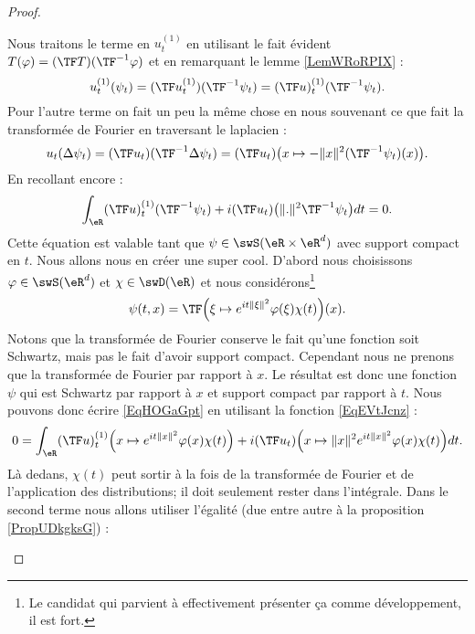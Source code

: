 \begin{proof}
\begin{subproof}
        Nous traitons le terme en \( u_t^{(1)}\) en utilisant le fait évident \( T(\varphi)=(\TF T)(\TF^{-1}\varphi)\) et en remarquant le lemme \ref{LemWRoRPIX} :
        \begin{equation}
            u_t^{(1)}(\psi_t)=(\TF u_t^{(1)})(\TF^{-1}\psi_t)=(\TF u)_t^{(1)}(\TF^{-1}\psi_t).
        \end{equation}
        Pour l'autre terme on fait un peu la même chose en nous souvenant ce que fait la transformée de Fourier en traversant le laplacien :
        \begin{equation}
            u_t(\Delta\psi_t)=(\TF u_t)(\TF^{-1}\Delta\psi_t)=(\TF u_t)\big( x\mapsto -\| x \|^2(\TF^{-1}\psi_t)(x) \big).
        \end{equation}
        En recollant encore :
        \begin{equation}    \label{EqHOGaGpt}
            \int_{\eR}(\TF u)^{(1)}_t(\TF^{-1}\psi_t)+i(\TF u_t)\big( \| . \|^2\TF^{-1}\psi_t \big)dt=0.
        \end{equation}
        Cette équation est valable tant que \( \psi\in \swS(\eR\times\eR^d)\) avec support compact en \( t\). Nous allons nous en créer une super cool. D'abord nous choisissons \( \varphi\in\swS(\eR^d)\) et \( \chi\in\swD(\eR)\) et nous considérons\footnote{Le candidat qui parvient à effectivement présenter ça comme développement, il est fort.}
        \begin{equation}    \label{EqEVtJcnz}
            \psi(t,x)=\TF\Big( \xi\mapsto  e^{it\| \xi \|^2}\varphi(\xi)\chi(t) \Big)(x).
        \end{equation}
        Notons que la transformée de Fourier conserve le fait qu'une fonction soit Schwartz, mais pas le fait d'avoir support compact. Cependant nous ne prenons que la transformée de Fourier par rapport à \( x\). Le résultat est donc une fonction \( \psi\) qui est Schwartz par rapport à \( x\) et support compact par rapport à \( t\). Nous pouvons donc écrire \eqref{EqHOGaGpt} en utilisant la fonction \eqref{EqEVtJcnz} :
        \begin{equation}    \label{EqHPUyZFz}
            0=\int_{\eR}(\TF u)_t^{(1)}\Big( x\mapsto e^{it\| x \|^2}\varphi(x)\chi(t) \Big)+i(\TF u_t)\Big( x\mapsto\| x \|^2 e^{it\| x \|^2}\varphi(x)\chi(t) \Big)dt.
        \end{equation}
        Là dedans, \( \chi(t)\) peut sortir à la fois de la transformée de Fourier et de l'application des distributions; il doit seulement rester dans l'intégrale. Dans le second terme nous allons utiliser l'égalité (due entre autre à la proposition \ref{PropUDkgksG}) :

\end{subproof}
\end{proof}
